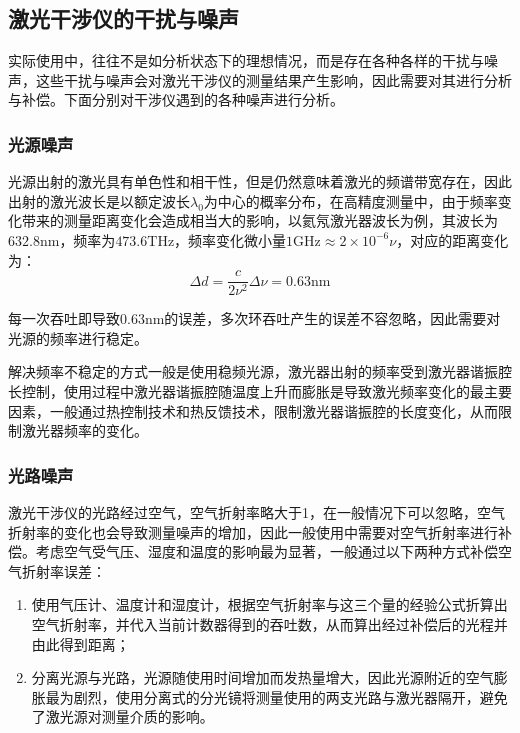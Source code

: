 \documentclass[11pt]{article}
\begin{document}
\subsection{激光干涉仪的干扰与噪声}
实际使用中，往往不是如分析状态下的理想情况，而是存在各种各样的干扰与噪声，这些干扰与噪声会对激光干涉仪的测量结果产生影响，因此需要对其进行分析与补偿。下面分别对干涉仪遇到的各种噪声进行分析。\par
\subsubsection{光源噪声}
光源出射的激光具有单色性和相干性，但是仍然意味着激光的频谱带宽存在，因此出射的激光波长是以额定波长$\lambda_0$为中心的概率分布，在高精度测量中，由于频率变化带来的测量距离变化会造成相当大的影响，以氦氖激光器波长为例，其波长为$632.8\mathrm{nm}$，频率为$473.6\mathrm{THz}$，频率变化微小量$1\mathrm{GHz}\approx 2\times 10^{-6}\nu$，对应的距离变化为：
\begin{equation}
  \Delta d=\frac{c}{2\nu^2}\Delta\nu=0.63\mathrm{nm}
  \label{eq:频率变化对应的距离变化}
\end{equation}\par
每一次吞吐即导致0.63nm的误差，多次环吞吐产生的误差不容忽略，因此需要对光源的频率进行稳定。\par
解决频率不稳定的方式一般是使用稳频光源，激光器出射的频率受到激光器谐振腔长控制，使用过程中激光器谐振腔随温度上升而膨胀是导致激光频率变化的最主要因素，一般通过热控制技术和热反馈技术，限制激光器谐振腔的长度变化，从而限制激光器频率的变化。\par
\subsubsection{光路噪声}
激光干涉仪的光路经过空气，空气折射率略大于1，在一般情况下可以忽略，空气折射率的变化也会导致测量噪声的增加，因此一般使用中需要对空气折射率进行补偿。考虑空气受气压、湿度和温度的影响最为显著，一般通过以下两种方式补偿空气折射率误差：
\begin{enumerate}
  \item 使用气压计、温度计和湿度计，根据空气折射率与这三个量的经验公式折算出空气折射率，并代入当前计数器得到的吞吐数，从而算出经过补偿后的光程并由此得到距离；
  \item 分离光源与光路，光源随使用时间增加而发热量增大，因此光源附近的空气膨胀最为剧烈，使用分离式的分光镜将测量使用的两支光路与激光器隔开，避免了激光源对测量介质的影响。
\end{enumerate}
\end{document}
